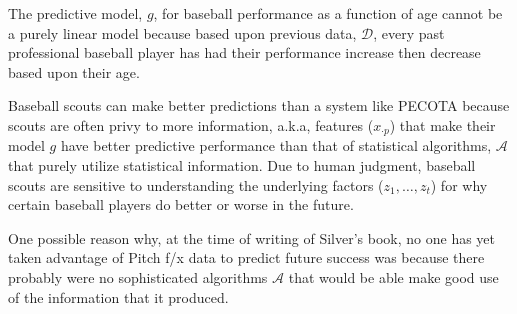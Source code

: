 \documentclass[12pt]{article}
\begin{document}
\begin{enumerate}
\begin{tcolorbox}[colback=white, sharp corners]
The predictive model, $g$, for baseball performance as a function of age cannot be a purely linear model because based upon previous data, $\mathcal{D}$, every past professional baseball player has had their performance increase then decrease based upon their age. 

\end{tcolorbox}


\begin{tcolorbox}[colback=white, sharp corners]

Baseball scouts can make better predictions than a system like PECOTA because scouts are often privy to more information, a.k.a, features ($x_{\cdot p}$) that make their model $g$ have better predictive performance than that of statistical algorithms, $\mathcal{A}$ that purely utilize statistical information. Due to human judgment, baseball scouts are sensitive to understanding the underlying factors ($z_1, \ldots, z_t$) for why certain baseball players do better or worse in the future. 

\end{tcolorbox}


\begin{tcolorbox}[colback=white, sharp corners]

One possible reason why, at the time of writing of Silver's book, no one has yet taken advantage of Pitch f/x data to predict future success was because there probably were no sophisticated algorithms $\mathcal{A}$ that would be able make good use of the information that it produced.  

\end{tcolorbox}


\end{enumerate}

\newpage
\end{document}
